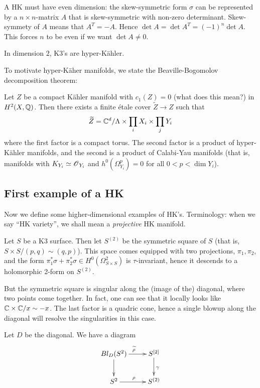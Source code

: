 \documentclass[11pt, english]{article}
\begin{document}
\begin{remark}
A HK must have even dimension: the skew-symmetric form $\sigma$ can be represented by a $n\times n$-matrix $A$ that is skew-symmetric with non-zero determinant. Skew-symmety of $A$ means that $A^T = -A$. Hence $\det A = \det A^T = (-1)^n \det A$. This forces $n$ to be even if we want $\det A \neq 0$.
\end{remark}

In dimension $2$, K3's are hyper-Kähler.

To motivate hyper-Käher manifolds, we state the Beaville-Bogomolov decomposition theorem:

\begin{thm}
Let $Z$ be a compact Kähler manifold with $c_1(Z)=0$ (what does this mean?) in $H^2(X, \mathbb{Q})$. Then there exists a finite étale cover $\widetilde Z \to Z$ such that 
$$
\widetilde Z = \mathbb{C}^d / \Lambda \times \prod_i X_i  \times \prod_j Y_i
$$
where the first factor is a compact torus. The second factor is a product of hyper-Kähler manifolds, and the second is a product of Calabi-Yau manifolds (that is, manifolds with $K_{Y_i} \simeq \operatorname{\mathscr{O}}_{Y_i}$ and $h^0(\Omega_{Y_i}^p)=0$ for all $0 < p < \dim Y_i$).
\end{thm}

\subsection{First example of a HK}

Now we define some higher-dimensional examples of HK's. Terminology: when we say ``HK variety'', we shall mean a \emph{projective} HK manifold.

Let $S$ be a K3 surface. Then let $S^{(2)}$ be the symmetric square of $S$ (that is, $S \times S/(p,q) \sim (q,p)$). This space comes equipped with two projections, $\pi_1, \pi_2$, and the form $\pi_1^\ast \sigma + \pi_2 ^\ast \sigma \in H^0(\Omega_{S \times S}^2)$ is $\tau$-invariant, hence it descends to a holomorphic 2-form on $S^{(2)}$. 

But the symmetric square is singular along the (image of the) diagonal, where two points come together. In fact, one can see that it locally looks like $\mathbb{C} \times \mathbb{C} /x \sim -x$. The last factor is a quadric cone, hence a single blowup along the diagonal will resolve the singularities in this case.

Let $D$ be the diagonal. We have a diagram
$$
\xymatrix{
	Bl_D(S^2) \ar[d] \ar[r]^{\widetilde \rho} & S^{[2]} \ar[d]^\gamma  \\
	S^2 \ar[r]^\rho & S^{(2)}
}
$$
\end{document}
